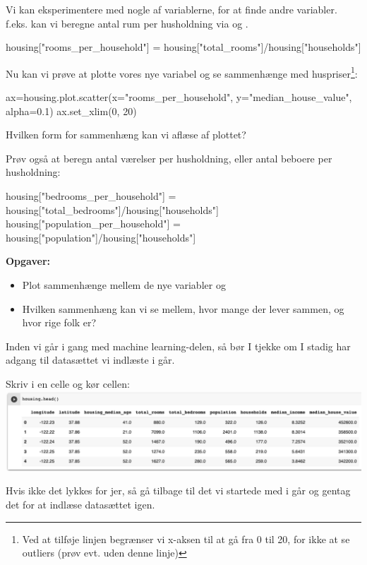 \documentclass{ucph-handout}
\newcommand{\Ark}{} %
\renewcommand{\Title}{\Ark Machine Learning og huspriser - Udforsk datasættet}
\begin{document}
\begin{exercisebox}[adjusted title=Kombiner variabler]
Vi kan eksperimentere med nogle af variablerne, for at finde andre variabler. f.eks. kan vi beregne antal rum per husholdning via  og .
\begin{python}
housing["rooms_per_household"] = housing["total_rooms"]/housing["households"]

\end{python}
Nu kan vi prøve at plotte vores nye variabel og se sammenhænge med huspriser\footnote{Ved at tilføje linjen  begrænser vi x-aksen til at gå fra 0 til 20, for ikke at se outliers (prøv evt. uden denne linje)}:
\begin{python}
ax=housing.plot.scatter(x="rooms_per_household", y="median_house_value", 
                        alpha=0.1)
ax.set_xlim(0, 20)
\end{python}

Hvilken form for sammenhæng kan vi aflæse af plottet?

Prøv også at beregn antal værelser per husholdning, eller antal beboere per husholdning:
\begin{python}
housing["bedrooms_per_household"] = housing["total_bedrooms"]/housing["households"]
housing["population_per_household"] = housing["population"]/housing["households"]
\end{python}

\textbf{Opgaver:}
\vspace{-2mm}
\begin{itemize}
    \item Plot sammenhænge mellem de nye variabler og 
    \item Hvilken sammenhæng kan vi se mellem, hvor mange der lever sammen, og hvor rige folk er?
\end{itemize}

\end{exercisebox}

\newpage
\renewcommand{\Title}{\Ark Machine Learning og huspriser - Klargøring}%
\begin{exercisebox}[adjusted title=Klargøring]
Inden vi går i gang med machine learning-delen, så bør I tjekke om I stadig har adgang til datasættet vi indlæste i går.\newline

Skriv  i en celle og kør cellen: \\
\includegraphics[width=\textwidth]{images/dataset_head}

Hvis ikke det lykkes for jer, så gå tilbage til det vi startede med i går og gentag det for at indlæse datasættet igen.
\end{exercisebox}
\end{document}
